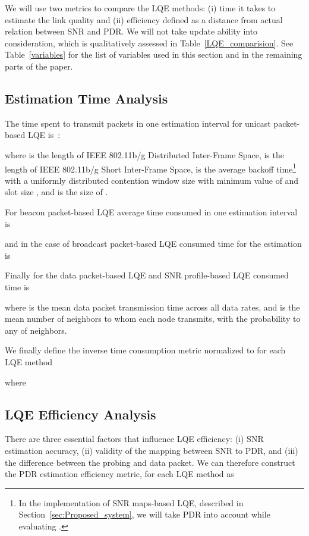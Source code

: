 \documentclass[11pt,draftclsnofoot,journal,onecolumn]{IEEEtran}
\begin{document}
We will use two metrics to compare the LQE methods: (i) time it takes to estimate the link quality and (ii) efficiency defined as a distance from actual relation between SNR and PDR. We will not take update ability into consideration, which is qualitatively assessed in Table~\ref{LQE_comparision}. See Table~\ref{variables} for the list of variables used in this section and in the remaining parts of the paper.

\subsection{Estimation Time Analysis}

The time spent to transmit packets in one estimation interval for unicast packet-based LQE is~\cite[Sec. II-A]{verma_2008_Wimesh}:

where  is the length of IEEE 802.11b/g Distributed Inter-Frame Space,  is the length of IEEE 802.11b/g Short Inter-Frame Space,  is the average backoff time\footnote{In the implementation of SNR maps-based LQE, described in Section~\ref{sec:Proposed_system}, we will take PDR into account while evaluating .} with a uniformly distributed contention window size with minimum value of  and slot size , and  is the size of .

For beacon packet-based LQE average time consumed in one estimation interval is

and in the case of broadcast packet-based LQE consumed time for the estimation is

Finally for the data packet-based LQE and SNR profile-based LQE consumed time is

where  is the mean data packet transmission time across all data rates, and  is the mean number of neighbors to whom each node transmits, with the probability  to any of  neighbors.

We finally define the inverse time consumption metric normalized to  for each LQE method

where


\subsection{LQE Efficiency Analysis}

There are three essential factors that influence LQE efficiency: (i) SNR estimation accuracy, (ii) validity of the mapping between SNR to PDR, and (iii) the difference between the probing and data packet. We can therefore construct the PDR estimation efficiency metric,  for each LQE method as
\end{document}
